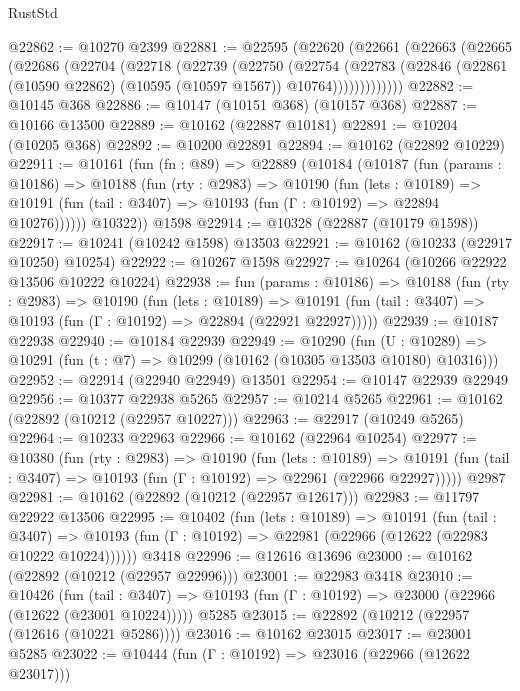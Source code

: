 \begin{lexlean}{RustStd}
\begin{coremodule}
@22862 := @10270 @2399
@22881 := @22595
    (@22620
      (@22661
        (@22663
          (@22665
            (@22686
              (@22704
                (@22718
                  (@22739
                    (@22750
                      (@22754
                        (@22783
                          (@22846
                            (@22861 (@10590 @22862) (@10595 (@10597 @1567)) @10764)))))))))))))
@22882 := @10145 @368
@22886 := @10147 (@10151 @368) (@10157 @368)
@22887 := @10166 @13500
@22889 := @10162 (@22887 @10181)
@22891 := @10204 (@10205 @368)
@22892 := @10200 @22891
@22894 := @10162 (@22892 @10229)
@22911 := @10161
    (fun (fn : @89) =>
    @22889
      (@10184
        (@10187
          (fun (params : @10186) =>
          @10188
            (fun (rty : @2983) =>
            @10190
              (fun (lets : @10189) =>
              @10191 (fun (tail : @3407) => @10193 (fun (Γ : @10192) => @22894 @10276))))))
        @10322))
    @1598
@22914 := @10328 (@22887 (@10179 @1598))
@22917 := @10241 (@10242 @1598) @13503
@22921 := @10162 (@10233 (@22917 @10250) @10254)
@22922 := @10267 @1598
@22927 := @10264 (@10266 @22922 @13506 @10222 @10224)
@22938 := fun (params : @10186) =>
  @10188
    (fun (rty : @2983) =>
    @10190
      (fun (lets : @10189) =>
      @10191 (fun (tail : @3407) => @10193 (fun (Γ : @10192) => @22894 (@22921 @22927)))))
@22939 := @10187 @22938
@22940 := @10184 @22939
@22949 := @10290
    (fun (U : @10289) => @10291 (fun (t : @7) => @10299 (@10162 (@10305 @13503 @10180) @10316)))
@22952 := @22914 (@22940 @22949) @13501
@22954 := @10147 @22939 @22949
@22956 := @10377 @22938 @5265
@22957 := @10214 @5265
@22961 := @10162 (@22892 (@10212 (@22957 @10227)))
@22963 := @22917 (@10249 @5265)
@22964 := @10233 @22963
@22966 := @10162 (@22964 @10254)
@22977 := @10380
    (fun (rty : @2983) =>
    @10190
      (fun (lets : @10189) =>
      @10191 (fun (tail : @3407) => @10193 (fun (Γ : @10192) => @22961 (@22966 @22927)))))
    @2987
@22981 := @10162 (@22892 (@10212 (@22957 @12617)))
@22983 := @11797 @22922 @13506
@22995 := @10402
    (fun (lets : @10189) =>
    @10191
      (fun (tail : @3407) =>
      @10193 (fun (Γ : @10192) => @22981 (@22966 (@12622 (@22983 @10222 @10224))))))
    @3418
@22996 := @12616 @13696
@23000 := @10162 (@22892 (@10212 (@22957 @22996)))
@23001 := @22983 @3418
@23010 := @10426
    (fun (tail : @3407) => @10193 (fun (Γ : @10192) => @23000 (@22966 (@12622 (@23001 @10224)))))
    @5285
@23015 := @22892 (@10212 (@22957 (@12616 (@10221 @5286))))
@23016 := @10162 @23015
@23017 := @23001 @5285
@23022 := @10444 (fun (Γ : @10192) => @23016 (@22966 (@12622 @23017)))

\end{coremodule}
\end{lexlean}
